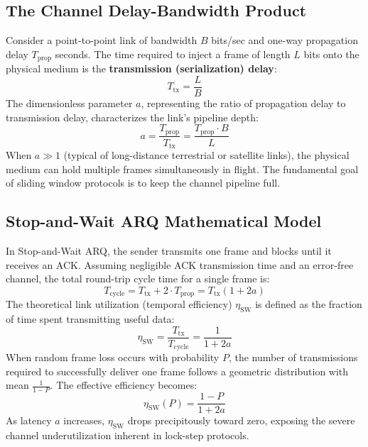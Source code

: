 \documentclass[11pt,a4paper]{article}
\begin{document}
\subsection{The Channel Delay-Bandwidth Product}
Consider a point-to-point link of bandwidth $B$ bits/sec and one-way propagation delay $T_{\text{prop}}$ seconds. The time required to inject a frame of length $L$ bits onto the physical medium is the \textbf{transmission (serialization) delay}:
\begin{equation}
    T_{\text{tx}} = \frac{L}{B}
\end{equation}
The dimensionless parameter $a$, representing the ratio of propagation delay to transmission delay, characterizes the link's pipeline depth:
\begin{equation}
    a = \frac{T_{\text{prop}}}{T_{\text{tx}}} = \frac{T_{\text{prop}} \cdot B}{L}
\end{equation}
When $a \gg 1$ (typical of long-distance terrestrial or satellite links), the physical medium can hold multiple frames simultaneously in flight. The fundamental goal of sliding window protocols is to keep the channel pipeline full.

\subsection{Stop-and-Wait ARQ Mathematical Model}
In Stop-and-Wait ARQ, the sender transmits one frame and blocks until it receives an ACK. Assuming negligible ACK transmission time and an error-free channel, the total round-trip cycle time for a single frame is:
\begin{equation}
    T_{\text{cycle}} = T_{\text{tx}} + 2 \cdot T_{\text{prop}} = T_{\text{tx}} (1 + 2a)
\end{equation}
The theoretical link utilization (temporal efficiency) $\eta_{\text{SW}}$ is defined as the fraction of time spent transmitting useful data:
\begin{equation}
    \eta_{\text{SW}} = \frac{T_{\text{tx}}}{T_{\text{cycle}}} = \frac{1}{1 + 2a}
\end{equation}
When random frame loss occurs with probability $P$, the number of transmissions required to successfully deliver one frame follows a geometric distribution with mean $\frac{1}{1 - P}$. The effective efficiency becomes:
\begin{equation}
    \eta_{\text{SW}}(P) = \frac{1 - P}{1 + 2a}
\end{equation}
As latency $a$ increases, $\eta_{\text{SW}}$ drops precipitously toward zero, exposing the severe channel underutilization inherent in lock-step protocols.
\end{document}

